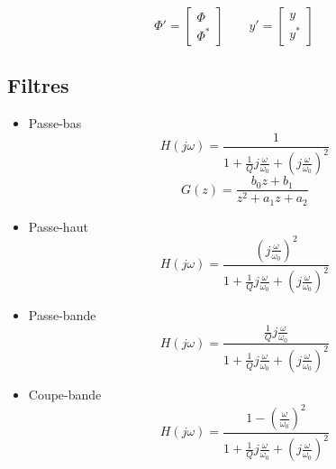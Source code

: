 \documentclass[resume]{subfiles}
\begin{document}
$$\Phi'=\begin{bmatrix}\Phi\\\Phi^\ast\end{bmatrix}\qquad y'=\begin{bmatrix}y\\y^\ast\end{bmatrix}$$
\subsection{Filtres}
\begin{itemize}
\item Passe-bas
$$H(j\omega)=\frac{1}{1+\frac{1}{Q}j\frac{\omega}{\omega_0}+\left(j\frac{\omega}{\omega_0}\right)^2}$$
$$G(z)=\frac{b_0z+b_1}{z^2+a_1z+a_2}$$
\item Passe-haut
$$H(j\omega)=\frac{\left(j\frac{\omega}{\omega_0}\right)^2}{1+\frac{1}{Q}j\frac{\omega}{\omega_0}+\left(j\frac{\omega}{\omega_0}\right)^2}$$
\item Passe-bande
$$H(j\omega)=\frac{\frac{1}{Q}j\frac{\omega}{\omega_0}}{1+\frac{1}{Q}j\frac{\omega}{\omega_0}+\left(j\frac{\omega}{\omega_0}\right)^2}$$
\item Coupe-bande
$$H(j\omega)=\frac{1-\left(\frac{\omega}{\omega_0}\right)^2}{1+\frac{1}{Q}j\frac{\omega}{\omega_0}+\left(j\frac{\omega}{\omega_0}\right)^2}$$
\end{itemize}
\end{document}
